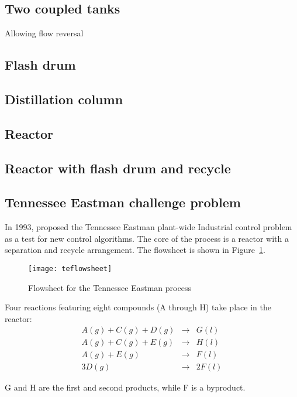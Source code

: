 \subsection{Two coupled tanks}
Allowing flow reversal

\subsection{Flash drum}

\subsection{Distillation column}

\subsection{Reactor}

\subsection{Reactor with flash drum and recycle}

\subsection{Tennessee Eastman challenge problem}
In 1993, \citet{downs.vogel1993plant-wide} proposed the Tennessee
Eastman plant-wide Industrial control problem as a test for new
control algorithms. The core of the process is a reactor with
a separation and recycle arrangement.  The flowsheet is shown in
Figure~\ref{fig:teprocess}.
\begin{figure}[htbp]
  \centering
  \texttt{[image: teflowsheet]}
  \caption{Flowsheet for the Tennessee Eastman process~\citep{tenesseeeastman}}
  \label{fig:teprocess}
\end{figure}

Four reactions featuring eight compounds (A through H) take place in the reactor:
\begin{eqnarray}
A(g) + C(g) + D(g) & \rightarrow & G(l) \\
A(g) + C(g) + E(g) & \rightarrow & H(l) \\
A(g) + E(g)        & \rightarrow & F(l) \\
3D(g)              & \rightarrow & 2F(l) 
\label{eq:te-reaction}
\end{eqnarray}

G and H are the first and second products, while F is a byproduct.


